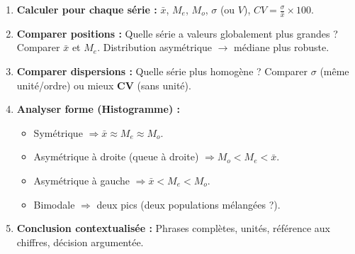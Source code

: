 \documentclass[11pt]{article}
\begin{document}
\begin{methode}
\begin{enumerate}
    \item \textbf{Calculer pour chaque série :} $\bar{x}$, $M_e$, $M_o$, $\sigma$ (ou $V$), $CV = \frac{\sigma}{\bar{x}}\times 100$.
    \item \textbf{Comparer positions :} Quelle série a valeurs globalement plus grandes ? Comparer $\bar{x}$ et $M_e$. Distribution asymétrique $\rightarrow$ médiane plus robuste.
    \item \textbf{Comparer dispersions :} Quelle série plus homogène ? Comparer $\sigma$ (même unité/ordre) ou mieux \textbf{CV} (sans unité).
    \item \textbf{Analyser forme (Histogramme) :}
    \begin{itemize}
        \item Symétrique $\Rightarrow \bar{x} \approx M_e \approx M_o$.
        \item Asymétrique à droite (queue à droite) $\Rightarrow M_o < M_e < \bar{x}$.
        \item Asymétrique à gauche $\Rightarrow \bar{x} < M_e < M_o$.
        \item Bimodale $\Rightarrow$ deux pics (deux populations mélangées ?).
    \end{itemize}
    \item \textbf{Conclusion contextualisée :} Phrases complètes, unités, référence aux chiffres, décision argumentée.
\end{enumerate}
\end{methode}
\end{document}

